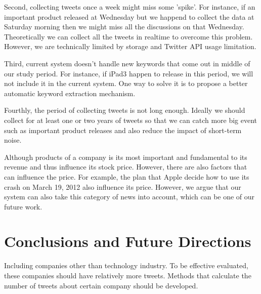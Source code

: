 \documentclass[12pt]{article}
\begin{document}
Second, collecting tweets once a week might miss some 'spike'. For instance, if an important product released at Wednesday but we happend to collect the data at Saturday morning then we might miss all the discussions on that Wednesday. Theoretically we can collect all the tweets in realtime to overcome this problem. However, we are technically limited by storage and Twitter API usage limitation.

Third, current system doesn't handle new keywords that come out in middle of our study period. For instance, if iPad3 happen to release in this period, we will not include it in the current system. One way to solve it is to propose a better automatic keyword extraction mechanism.

Fourthly, the period of collecting tweets is not long enough. Ideally we should collect for at least one or two years of tweets so that we can catch more big event such as important product releases and also reduce the impact of short-term noise.

Although products of a company is its most important and fundamental to its revenue and thus influence its stock price. However, there are also factors that can influence the price. For example, the plan that Apple decide how to use its crash on March 19, 2012 also influence its price. However, we argue that our system can also take this category of news into account, which can be one of our future work.

\section{Conclusions and Future Directions}

Including companies other than technology industry. To be effective evaluated, these companies should have relatively more tweets. Methods that calculate the number of tweets about certain company should be developed.



\end{document}
